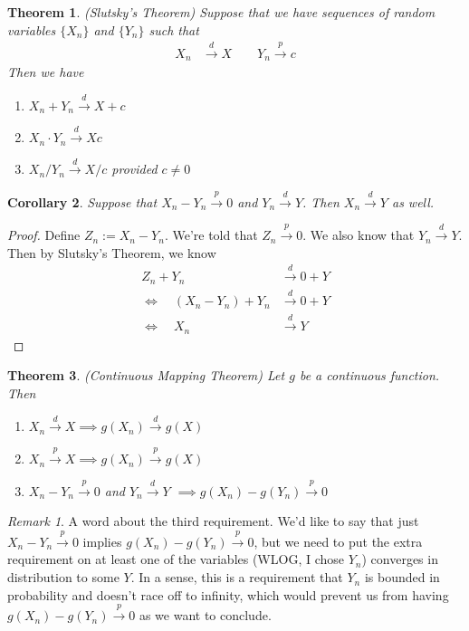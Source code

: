 \documentclass[12pt]{article}
\theoremstyle{plain}
\newtheorem{thm}{Theorem}[section]
\newtheorem{cor}[thm]{Corollary}
\theoremstyle{definition}
\theoremstyle{remark}
\newtheorem*{rmk}{Remark}
\newcommand{\pto}{\xrightarrow{p}}
\newcommand{\dto}{\xrightarrow{d}}
\begin{document}
\begin{thm}{\emph{(Slutsky's Theorem)}}
Suppose that we have sequences of random variables $\{X_n\}$ and
$\{Y_n\}$ such that
\begin{align*}
  X_n &\dto X
  \qquad
  Y_n \pto c
\end{align*}
Then we have
\begin{enumerate}
  \item $X_n+Y_n\dto X+c$
  \item $X_n\cdot Y_n\dto Xc$
  \item $X_n/Y_n\dto X/c$ provided $c\neq 0$
\end{enumerate}
\end{thm}

\begin{cor}
Suppose that $X_n - Y_n\pto 0$ and $Y_n\dto Y$. Then $X_n \dto Y$ as
well.
\end{cor}
\begin{proof}
Define $Z_n := X_n - Y_n$. We're told that $Z_n\pto 0$. We also know
that $Y_n\dto Y$. Then by Slutsky's Theorem, we know
\begin{align*}
  Z_n + Y_n &\dto 0 + Y \\
  \Leftrightarrow\quad (X_n-Y_n) + Y_n &\dto 0 + Y \\
  \Leftrightarrow\quad X_n &\dto Y
\end{align*}
\end{proof}

\begin{thm}\emph{(Continuous Mapping Theorem)}
Let $g$ be a continuous function. Then
\begin{enumerate}
  \item $X_n\dto X \implies g(X_n) \dto g(X)$
  \item $X_n\pto X \implies g(X_n) \pto g(X)$
  \item $X_n - Y_n\pto 0$ and $Y_n \dto Y$
    $\implies g(X_n) - g(Y_n)\pto 0$
\end{enumerate}
\end{thm}
\begin{rmk}
A word about the third requirement. We'd like to say that just
$X_n - Y_n\pto 0$ implies $g(X_n) - g(Y_n)\pto 0$, but we need to put
the extra requirement on at least one of the variables (WLOG, I chose
$Y_n$) converges in distribution to some $Y$. In a sense, this is a
requirement that $Y_n$ is bounded in probability and doesn't race off to
infinity, which would prevent us from having $g(X_n)-g(Y_n) \pto 0$ as
we want to conclude.
\end{rmk}
\end{document}
